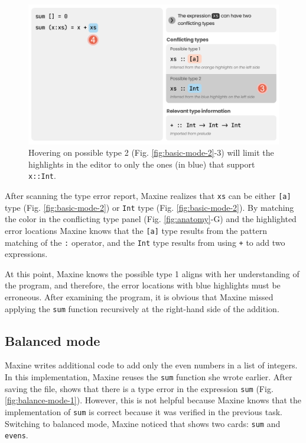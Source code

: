 \begin{figure}
        \centering
        \includegraphics[width=\linewidth]{images/basic-mode-3.pdf}
        \caption{
            Hovering on possible type 2 (Fig. \ref{fig:basic-mode-2}-3) will limit the highlights 
            in the editor to only the ones (in blue) that support \texttt{x::Int}.
        }
        \label{fig:basic-mode-3}
\end{figure}





After scanning the type error report, Maxine realizes that \texttt{xs} can be
either \texttt{[a]} type (Fig. \ref{fig:basic-mode-2}) or \texttt{Int} type (Fig. \ref{fig:basic-mode-2}). By matching the color in the
conflicting type panel (Fig. \ref{fig:anatomy}-G) and the highlighted error locations 
Maxine knows that the \texttt{[a]} type results from the pattern matching of the
\texttt{:} operator, and the \texttt{Int} type results from using \texttt{+} to
 add two expressions. 


At this point, Maxine knows the possible type 1 aligns with her understanding of
the program, and therefore, the error locations with blue highlights must be
erroneous. After examining the program, it is obvious that Maxine missed
applying the \texttt{sum} function recursively at the right-hand side of the
addition. 


\subsection{Balanced mode} \label{sub:balanced}


Maxine writes additional code to add only the even numbers in a list of integers.
In this implementation, Maxine reuses the \texttt{sum} function she wrote
earlier. After saving the file, \chameleon{} shows that there is a type error in the
expression \texttt{sum} (Fig. \ref{fig:balance-mode-1}). However, this is not 
helpful because Maxine knows that the implementation of  \texttt{sum} is correct 
because it was verified in the previous task. Switching to
balanced mode, Maxine noticed that \chameleon{} shows two cards: \texttt{sum}
and \texttt{evens}. 


